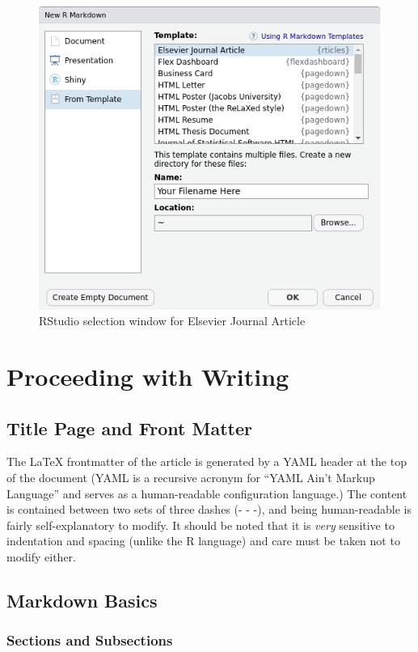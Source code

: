 \documentclass[]{elsarticle} %
\begin{document}
\begin{figure}[H]

{\centering \includegraphics[width=0.6\linewidth,]{Figure1} 

}

\caption{RStudio selection window for Elsevier Journal Article}\label{fig:fig1}
\end{figure}

\hypertarget{proceeding-with-writing}{%
\section{Proceeding with Writing}\label{proceeding-with-writing}}

\hypertarget{title-page-and-front-matter}{%
\subsection{Title Page and Front
Matter}\label{title-page-and-front-matter}}

The LaTeX frontmatter of the article is generated by a YAML header at
the top of the document (YAML is a recursive acronym for ``YAML Ain't
Markup Language'' and serves as a human-readable configuration
language.) The content is contained between two sets of three dashes (-
- -), and being human-readable is fairly self-explanatory to modify. It
should be noted that it is \emph{very} sensitive to indentation and
spacing (unlike the R language) and care must be taken not to modify
either.

\hypertarget{markdown-basics}{%
\subsection{Markdown Basics}\label{markdown-basics}}

\hypertarget{sections-and-subsections}{%
\subsubsection{Sections and
Subsections}\label{sections-and-subsections}}
\end{document}
